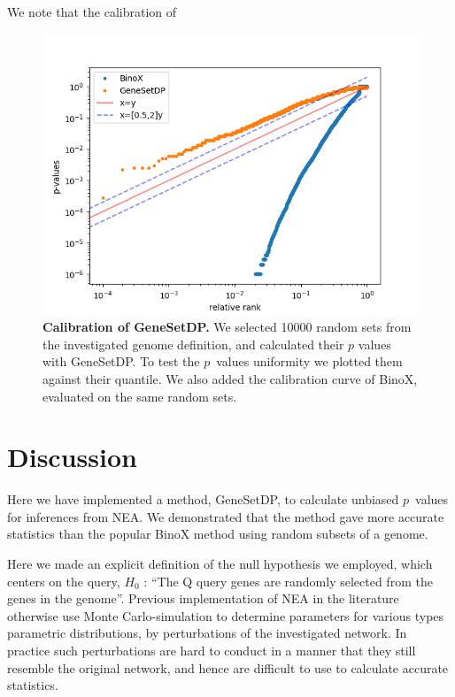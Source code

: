 \documentclass[a4paper,american]{lipics-v2016}
\begin{document}
We note that the calibration of

\begin{figure}[htb]
		\begin{center}
				\includegraphics[scale=0.8]{figures/F2_calibration.png}
		\end{center}

  \caption{{\bf Calibration of GeneSetDP.} We selected 10000 random sets from the investigated genome definition, and calculated their $p$ values with GeneSetDP. To test the $p$~values uniformity we plotted them against their quantile. We also added the calibration curve of BinoX, evaluated on the same random sets.}
  \label{fig:calibration}
\end{figure}


\section*{Discussion}

Here we have implemented a method, GeneSetDP, to calculate unbiased $p$~values for inferences from NEA. We demonstrated that the method gave more accurate statistics than the popular BinoX method using random subsets of a genome.

Here we made an explicit definition of the null hypothesis we employed, which centers on the query, $H_0$ : ``The Q query genes are randomly selected from the genes in the genome''. Previous implementation of NEA in the literature otherwise use Monte Carlo-simulation to determine parameters for various types parametric distributions, by perturbations of the investigated network. In practice such perturbations are hard to conduct in a manner that they still resemble the original network, and hence are difficult to use to calculate accurate statistics.



\end{document}
